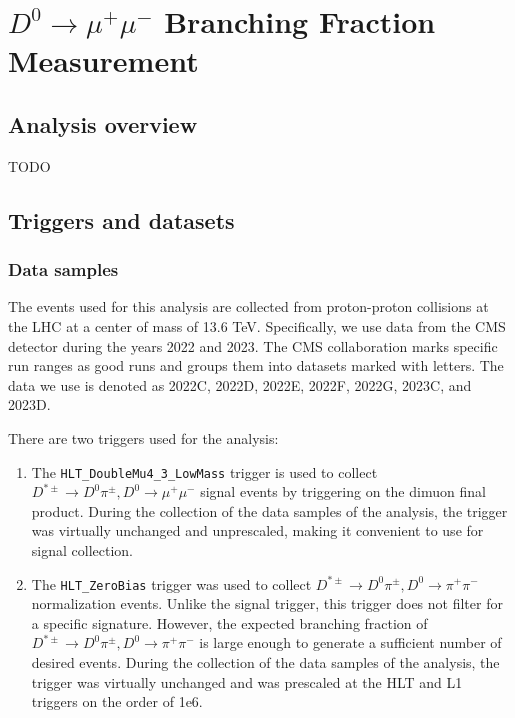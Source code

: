 \chapter{$D^0 \to \mu^+\mu^-$ Branching Fraction Measurement}

\section{Analysis overview}

TODO

\section{Triggers and datasets}

\subsection{Data samples}

The events used for this analysis are collected from proton-proton collisions at the LHC at a center of mass of 13.6 TeV. Specifically, we use data from the CMS detector during the years 2022 and 2023. The CMS collaboration marks specific run ranges as good runs and groups them into datasets marked with letters. The data we use is denoted as 2022C, 2022D, 2022E, 2022F, 2022G, 2023C, and 2023D. 

There are two triggers used for the analysis:
\begin{enumerate}
    \item The \texttt{HLT\_DoubleMu4\_3\_LowMass} trigger is used to collect $D^{*\pm} \to D^0 \pi^\pm, D^0 \to \mu^+ \mu^-$ signal events by triggering on the dimuon final product. During the collection of the data samples of the analysis, the trigger was virtually unchanged and unprescaled, making it convenient to use for signal collection.
    \item The \texttt{HLT\_ZeroBias} trigger was used to collect $D^{*\pm} \to D^0 \pi^\pm, D^0 \to \pi^+ \pi^-$ normalization events. Unlike the signal trigger, this trigger does not filter for a specific signature. However, the expected branching fraction of $D^{*\pm} \to D^0 \pi^\pm, D^0 \to \pi^+ \pi^-$ is large enough to generate a sufficient number of desired events. During the collection of the data samples of the analysis, the trigger was virtually unchanged and was prescaled at the HLT and L1 triggers on the order of 1e6. 
\end{enumerate}

